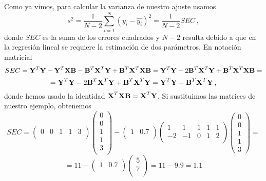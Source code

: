 \documentclass[
]{agujournal2019}
\begin{document}
\vspace{0.5cm}

\noindent Como ya vimos, para calcular la varianza de nuestro ajuste
usamos
\[s^2=\frac{1}{N-2}\sum\limits^N_{i=1}(y_i-\hat{y_i})^2=\frac{1}{N-2}SEC\,,\]
donde \(SEC\) es la suma de los errores cuadrados y \(N-2\) resulta
debido a que en la regresión lineal se requiere la estimación de dos
parámetros. En notación matricial
\[SEC={\textbf Y}^T{\textbf Y} - {\textbf Y}^T{\textbf X}{\textbf B}-{\textbf B}^T{\textbf X}^T{\textbf Y}+{\textbf B}^T
{\textbf X}^T{\textbf X}{\textbf B}=
{\textbf Y}^T{\textbf Y}-2{\textbf B}^T{\textbf X}^T{\textbf Y}+{\textbf B}^T{\textbf X}^T{\textbf X}{\textbf B}=\]
\[={\textbf Y}^T{\textbf Y}-2{\textbf B}^T{\textbf X}^T{\textbf Y}+{\textbf B}^T{\textbf X}^T{\textbf Y}=
{\textbf Y}^T{\textbf Y}-{\textbf B}^T{\textbf X}^T{\textbf Y}\,,\]
donde hemos usado la identidad
\({\textbf X}^T{\textbf X}{\textbf B}={\textbf X}^T{\textbf Y}\). Si
sustituimos las matrices de nuestro ejemplo, obtenemos
\[SEC=\left(\begin{array}{ccccc}
  0 & 0 & 1 & 1 & 3\\
        \end{array}\right)
      \left(\begin{array}{c}
  0 \\ 0 \\ 1 \\ 1 \\ 3\\
        \end{array}\right)-
    \left(\begin{array}{ccccc}
  1 & 0.7\\
        \end{array}\right)
    \left(\begin{array}{ccccc}
   1 &  1 & 1 & 1 & 1\\
  -2 & -1 & 0 & 1 & 2 \\
        \end{array}\right)
    \left(\begin{array}{c}
  0 \\ 0 \\ 1 \\ 1 \\ 3
        \end{array}\right)=\] \[=11-\left(\begin{array}{ccccc}
  1 & 0.7\\
        \end{array}\right)
    \left(\begin{array}{c}
        5 \\ 7\\
        \end{array}\right)=11-9.9=1.1\]
\end{document}
